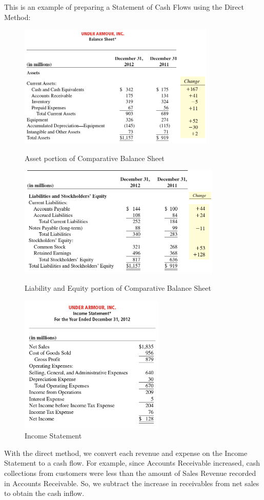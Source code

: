 \documentclass[../main.tex]{subfiles}
\begin{document}
	This is an example of preparing a Statement of Cash Flows using the Direct 
	Method:
	\begin{figure}[ht!]
		\centering
		\includegraphics[width=1\columnwidth]{images/c11/ua_comparative_bs.png}
		\caption{Asset portion of Comparative Balance Sheet}
		\includegraphics[width=1\columnwidth]{images/c11/ua_comparative_bs_liability_equity.png}
		\caption{Liability and Equity portion of Comparative Balance Sheet}
		\includegraphics[width=0.65\columnwidth]{images/c11/ua_income_statement.png}
		\caption{Income Statement}
	\end{figure}
	
	With the direct method, we convert each revenue and expense on the Income 
	Statement to a cash flow. For example, since Accounts Receivable increased, 
	cash collections from customers were less than the amount of Sales Revenue 
	recorded in Accounts Receivable. So, we subtract the increase in 
	receivables from net sales to obtain the cash inflow.
	
\end{document}
